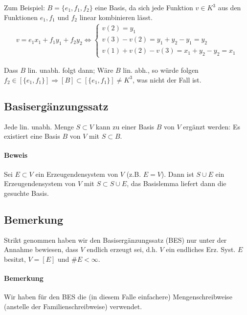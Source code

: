     Zum Beispiel: $B=\{e_1,f_1,f_2\}$ eine Basis, da sich jede Funktion $v\in K^3$ aus den Funktionen $e_1,f_1$ und $f_2$ linear kombinieren lässt.
    \begin{gather*}
        v=e_1x_1+f_1y_1 + f_2y_2\Leftrightarrow \left\{
            \begin{array}{l}
                v(2)=y_1\\
                v(3) - v(2) = y_1 + y_2 - y_1 = y_2\\
                v(1) + v(2) - v(3) = x_1 + y_2 - y_2 = x_1
            \end{array}
    	\right.
    \end{gather*}

    Dass $B$ lin. unabh. folgt dann; Wäre $B$ lin. abh., so würde folgen $f_2\in [\{e_1,f_1\}]\Rightarrow [B] \subset [\{e_1,f_1\}] \neq K^3$, was nicht der Fall ist.

\subsection{Basisergänzungssatz}
    \begin{Satz}[Basisergänzungssatz]
    	Jede lin. unabh. Menge $S\subset V$ kann zu einer Basis $B$ von $V$ ergänzt werden: Es existiert eine Basis $B$ von $V$ mit $S\subset B$.
    \end{Satz}

\paragraph{Beweis}
    Sei $E\subset V$ ein Erzeugendensystem von $V$ (z.B. $E=V$). Dann ist $S\cup E$ ein Erzeugendensystem von $V$ mit $S\subset S\cup E$, das Basislemma liefert dann die gesuchte Basis.

\subsection{Bemerkung}
    Strikt genommen haben wir den Basisergänzungssatz (BES) nur unter der Annahme bewiesen, dass $V$ endlich erzeugt sei, d.h. $V$ ein endliches Erz. Syst. $E$ besitzt, $V=[E]$ und $\#E<\infty$.
    
\paragraph{Bemerkung}
    Wir haben für den BES die (in diesem Falle einfachere) Mengenschreibweise (anstelle der Familienschreibweise) verwendet.
    
